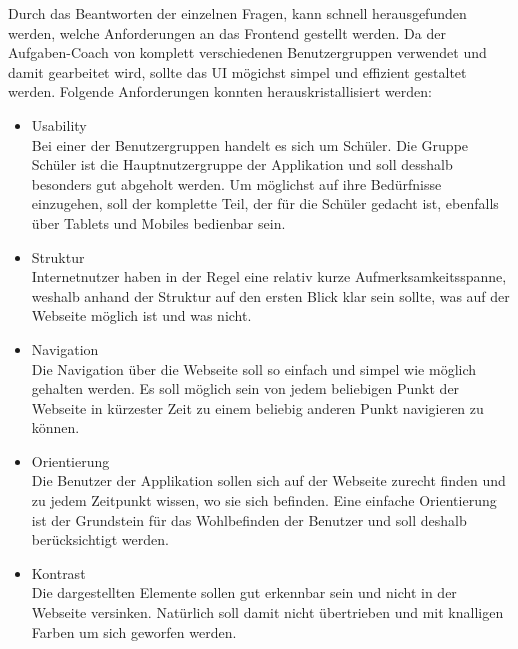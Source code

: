 Durch das Beantworten der einzelnen Fragen, kann schnell herausgefunden werden, welche Anforderungen an das Frontend gestellt werden. Da der Aufgaben-Coach von komplett verschiedenen Benutzergruppen verwendet und damit gearbeitet wird, sollte das UI mögichst simpel und effizient gestaltet werden. Folgende Anforderungen konnten herauskristallisiert werden:

\begin{itemize}
	\item Usability \\
		Bei einer der Benutzergruppen handelt es sich um Schüler. Die Gruppe Schüler ist die Hauptnutzergruppe der Applikation und soll desshalb besonders gut abgeholt werden. Um möglichst auf ihre Bedürfnisse einzugehen, soll der komplette Teil, der für die Schüler gedacht ist, ebenfalls über Tablets und Mobiles bedienbar sein.
		
		
	\item Struktur \\
		Internetnutzer haben in der Regel eine relativ kurze Aufmerksamkeitsspanne, weshalb anhand der Struktur auf den ersten Blick klar sein sollte, was auf der Webseite möglich ist und was nicht. 
		
		
	\item Navigation \\
		Die Navigation über die Webseite soll so einfach und simpel wie möglich gehalten werden. Es soll möglich sein von jedem beliebigen Punkt der Webseite in kürzester Zeit zu einem beliebig anderen Punkt navigieren zu können.
		
	
	\item Orientierung \\
		Die Benutzer der Applikation sollen sich auf der Webseite zurecht finden und zu jedem Zeitpunkt wissen, wo sie sich befinden. Eine einfache Orientierung ist der Grundstein für das Wohlbefinden der Benutzer und soll deshalb berücksichtigt werden.
		
	\item Kontrast \\
		Die dargestellten Elemente sollen gut erkennbar sein und nicht in der Webseite versinken. Natürlich soll damit nicht übertrieben und mit knalligen Farben um sich geworfen werden.
\end{itemize}


